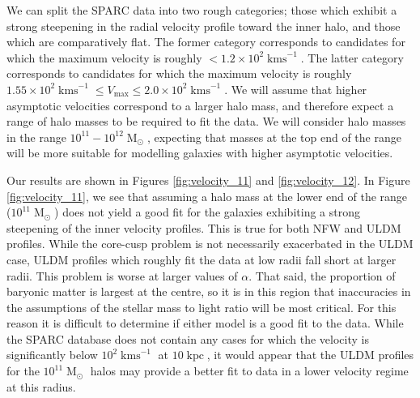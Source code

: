 \documentclass[a4paper,11pt]{article}
\begin{document}
We can split the SPARC data into two rough categories; those which exhibit a strong steepening in the radial velocity profile toward the inner halo, and those which are comparatively flat. The former category corresponds to candidates for which the maximum velocity is roughly $< 1.2\times 10^2 \operatorname{kms}^{-1}$. The latter category corresponds to candidates for which the maximum velocity is roughly $1.55\times 10^2 \operatorname{kms}^{-1}\leq V_{\mathrm{max}}\leq 2.0\times 10^2 \operatorname{kms}^{-1}$. We will assume that higher asymptotic velocities correspond to a larger halo mass, and therefore expect a range of halo masses to be required to fit the data. We will consider halo masses in the range $10^{11} - 10^{12} \operatorname{M}_{\odot}$, expecting that masses at the top end of the range will be more suitable for modelling galaxies with higher asymptotic velocities. 

Our results are shown in Figures \ref{fig:velocity_11} and \ref{fig:velocity_12}. In Figure \ref{fig:velocity_11}, we see that assuming a halo mass at the lower end of the range ($10^{11}\operatorname{M}_{\odot}$) does not yield a good fit for the galaxies exhibiting a strong steepening of the inner velocity profiles. This is true for both NFW and ULDM profiles. While the core-cusp problem is not necessarily exacerbated in the ULDM case, ULDM profiles which roughly fit the data at low radii fall short at larger radii. This problem is worse at larger values of $\alpha$. That said, the proportion of baryonic matter is largest at the centre, so it is in this region that inaccuracies in the assumptions of the stellar mass to light ratio will be most critical. For this reason it is difficult to determine if either model is a good fit to the data. While the SPARC database does not contain any cases for which the velocity is significantly below $10^2\operatorname{kms}^{-1}$ at $10 \operatorname{kpc}$, it would appear that the ULDM profiles for the $10^{11}\operatorname{M}_{\odot}$ halos may provide a better fit to data in a lower velocity regime at this radius.
\end{document}
